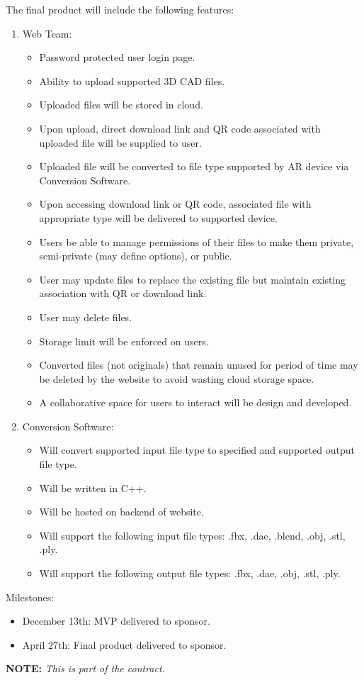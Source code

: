 % 




The final product will include the following features:

\begin{enumerate}
	\item Web Team:
	\begin{itemize}
		\item Password protected user login page. 
		\item Ability to upload supported 3D CAD files. 
		\item Uploaded files will be stored in cloud.
		\item Upon upload, direct download link and QR code associated with uploaded file will be supplied to user. 
		\item Uploaded file will be converted to file type supported by AR device via Conversion Software. 
		\item Upon accessing download link or QR code, associated file with appropriate type will be delivered to supported device. 
		\item Users be able to manage permissions of their files to make them private, semi-private (may define options), or public.
		\item User may update files to replace the existing file but maintain existing association with QR or download link.
		\item User may delete files. 
		\item Storage limit will be enforced on users. 
		\item Converted files (not originals) that remain unused for period of time may be deleted by the website to avoid wasting cloud storage space.  
		\item A collaborative space for users to interact will be design and developed. 
	\end{itemize}
	\item Conversion Software:
	\begin{itemize}
		\item Will convert supported input file type to specified and supported output file type. 
		\item Will be written in C++. 
		\item Will be hosted on backend of website. 
		\item Will support the following input file types: .fbx, .dae, .blend, .obj, .stl, .ply.
		\item Will support the following output file types: .fbx, .dae, .obj, .stl, .ply.
	\end{itemize} 
\end{enumerate}

Milestones:

\begin{itemize}
	\item December 13th: MVP delivered to sponsor. 
	\item April 27th: Final product delivered to sponsor.
\end{itemize}


\vspace{2\baselineskip}
\centerline{\Large {\bf NOTE:} {\em This is part of the contract.}}

